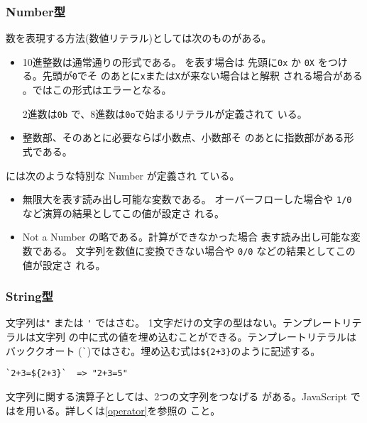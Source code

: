\subsubsection{Number型}
数を表現する方法(数値リテラル)としては次のものがある。
\begin{itemize}
 \item{\bfseries {}} 10進整数は通常通りの形式である。
      を表す場合は
	      先頭に\Verb+0x+ か \Verb+0X+ をつける。先頭が\Verb+0+でそ
	      のあとに\Verb+x+または\Verb+X+が来ない場合はと解釈
      される場合がある
      。\Strict ではこの形式はエラーとなる。

      2進数は\Verb+0b+ で、8進数は\Verb+0o+で始まるリテラルが定義されて
      いる。
 \item{\bfseries {}} 整数部、そのあとに必要ならば小数点、小数部そ
       のあとに指数部がある形式である。
\end{itemize}
には次のような特別な Number が定義され
ている。
\begin{itemize}
 \item {\bfseries {}}無限大を表す読み出し可能な変数である。
       オーバーフローした場合や \Verb+1/0+ など演算の結果としてこの値が設定さ
       れる。
 \item {\bfseries {}} Not a Number の略である。計算ができなかった場合
       表す読み出し可能な変数である。
       文字列を数値に変換できない場合や \Verb+0/0+ などの結果としてこの値が設定さ
       れる。
\end{itemize}
\subsubsection{String型}
文字列は\Verb+"+ または \Verb+'+ ではさむ。%
1文字だけの文字の型はない。テンプレートリテラルは文字列
の中に式の値を埋め込むことができる。テンプレートリテラルはバッククオート
(\Verb+`+)ではさむ。埋め込む式は\texttt{\$\{2+3\}}のように記述する。
\begin{Verbatim}
`2+3=${2+3}`  => "2+3=5"
\end{Verbatim}
文字列に関する演算子としては、2つの文字列をつなげる
がある。JavaScript では\ElmJ{+}を用いる。詳しくは\ref{operator}を参照の
こと。

